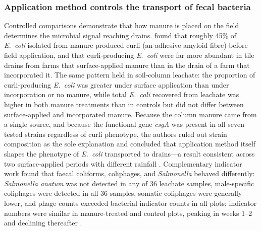 \documentclass[11pt]{article}
\begin{document}
\subsubsection{Application method controls the transport of fecal bacteria}
Controlled comparisons demonstrate that how manure is placed on the field determines the microbial signal reaching drains. \textcite{Truhlar2015} found that roughly 45\% of \textit{E.\ coli} isolated from manure produced curli (an adhesive amyloid fibre) before field application, and that curli-producing \textit{E.\ coli} were far more abundant in tile drains from farms that surface-applied manure than in the drain of a farm that incorporated it. The same pattern held in soil-column leachate: the proportion of curli-producing \textit{E.\ coli} was greater under surface application than under incorporation or no manure, while total \textit{E.\ coli} recovered from leachate was higher in both manure treatments than in controls but did not differ between surface-applied and incorporated manure. Because the column manure came from a single source, and because the functional gene \textit{csgA} was present in all seven tested strains regardless of curli phenotype, the authors ruled out strain composition as the sole explanation and concluded that application method itself shapes the phenotype of \textit{E.\ coli} transported to drains---a result consistent across two surface-applied periods with different rainfall \parencite{Truhlar2015}. Complementary indicator work found that faecal coliforms, coliphages, and \textit{Salmonella} behaved differently: \textit{Salmonella anatum} was not detected in any of 36 leachate samples, male-specific coliphages were detected in all 36 samples, somatic coliphages were generally lower, and phage counts exceeded bacterial indicator counts in all plots; indicator numbers were similar in manure-treated and control plots, peaking in weeks 1--2 and declining thereafter \parencite{Malik2004}.
\end{document}
